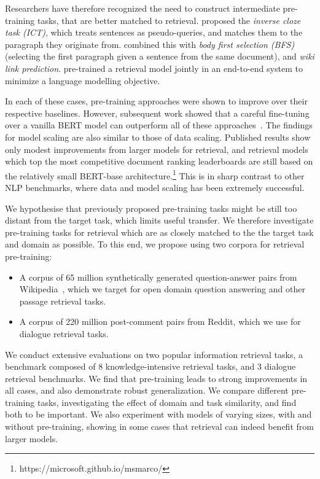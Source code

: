 \documentclass[11pt]{article}
\begin{document}
Researchers have therefore recognized the need to construct intermediate pre-training tasks, that are better matched to retrieval.  \citet{orqa} proposed the \textit{inverse cloze task (ICT)}, which treats sentences as pseudo-queries, and matches them to the paragraph they originate from. \citet{chang2020pre} combined this with \textit{body first selection (BFS)} (selecting the first paragraph given a sentence from the same document), and \textit{wiki link prediction}.  \citet{REALM} pre-trained a retrieval model jointly in an end-to-end system to minimize a language modelling objective.  

In each of these cases, pre-training approaches were shown to improve over their respective baselines.  However, subsequent work showed that a careful fine-tuning over a vanilla BERT model can outperform all of these approaches~\cite{dpr}.  The findings for model scaling are also similar to those of data scaling.  Published results show only modest improvements from larger models for retrieval, and retrieval models which top the most competitive document ranking leaderboards are still based on the relatively small BERT-base architecture.\footnote{https://microsoft.github.io/msmarco/}  This is in sharp contrast to other NLP benchmarks, where data and model scaling has been extremely successful. 


We hypothesise that previously proposed pre-training tasks might be still too distant from the target task, which limits useful transfer.  We therefore investigate pre-training tasks for retrieval which are as closely matched to the the target task and domain as possible.  To this end, we propose using two corpora for retrieval pre-training:
\begin{itemize}
  \item A corpus of 65 million synthetically generated question-answer pairs from Wikipedia~\citep[PAQ,][]{lewis2021paq}, which we target for open domain question answering and other passage retrieval tasks.
  \item A corpus of 220 million post-comment pairs from Reddit, which we use for dialogue retrieval tasks.
\end{itemize}

We conduct extensive evaluations on two popular information retrieval tasks, a benchmark composed of 8 knowledge-intensive retrieval tasks, and 3 dialogue retrieval benchmarks.  We find that pre-training leads to strong improvements in all cases, and also demonstrate robust generalization.  We compare different pre-training tasks, investigating the effect of domain and task similarity, and find both to be important.  We also experiment with models of varying sizes, with and without pre-training, showing in some cases that retrieval can indeed benefit from larger models. 
 
\end{document}
